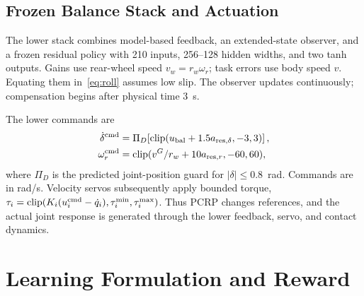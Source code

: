 \documentclass[journal]{IEEEtran}
\newcommand{\clip}{\operatorname{clip}}\newcommand{\sat}{\operatorname{sat}}
\begin{document}
\subsection{Frozen Balance Stack and Actuation}
The lower stack combines model-based feedback, an extended-state observer, and a frozen residual policy with 210 inputs, 256--128 hidden widths, and two tanh outputs. Gains use rear-wheel speed $v_w=r_w\omega_r$; task errors use body speed $v$. Equating them in~\eqref{eq:roll} assumes low slip. The observer updates continuously; compensation begins after physical time 3~s.

The lower commands are
\begin{align}
 \dot\delta^{\rm cmd}&=\Pi_{D}\!\left[\clip(u_{\rm bal}+1.5a_{{\rm res},\delta},-3,3)\right],\nonumber\\
 \omega_r^{\rm cmd}&=\clip(v^G/r_w+10a_{{\rm res},r},-60,60),
 \label{eq:commands}
\end{align}
where $\Pi_D$ is the predicted joint-position guard for $|\delta|\leq0.8$~rad. Commands are in rad/s. Velocity servos subsequently apply bounded torque,
$\tau_i=\clip(K_i(u_i^{\rm cmd}-\dot q_i),\tau_i^{\min},\tau_i^{\max})$.
Thus PCRP changes references, and the actual joint response is generated through the lower feedback, servo, and contact dynamics.

\section{Learning Formulation and Reward}
\end{document}
